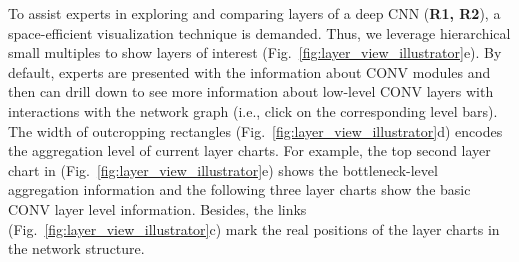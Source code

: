 \documentclass[format=acmsmall, review=false, screen=true]{acmart}
\newcommand{\ti}{\textcolor[rgb]{0,0,0}}
\begin{document}
To assist experts in exploring and comparing layers of a deep CNN (\textbf{R1, R2}), a space-efficient visualization technique is demanded.
Thus, we leverage hierarchical small multiples to show layers of interest (Fig.~\ref{fig:layer_view_illustrator}e).
\ti{By default, experts are presented with the information about CONV modules and then can drill down to see more information about low-level CONV layers with interactions with the network graph (i.e., click on the corresponding level bars).
The width of outcropping rectangles (Fig.~\ref{fig:layer_view_illustrator}d) encodes the aggregation level of current layer charts. For example, the top second layer chart in (Fig.~\ref{fig:layer_view_illustrator}e) shows the bottleneck-level aggregation information and the following three layer charts show the basic CONV layer level information. Besides, the links (Fig.~\ref{fig:layer_view_illustrator}c) mark the real positions of the layer charts in the network structure.
}
\end{document}
